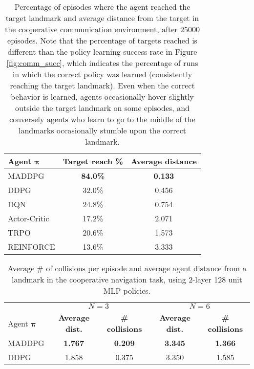 \documentclass{article}
\newcommand{\pol}[0]{\pmb{\pi}}
\begin{document}
\begin{table*}[ht!]
\small
\centering
\begin{tabular}{l c c}
\toprule
Agent $\pol$& \textbf{Target reach \% }&    \textbf{Average distance}   \\ \hline
MADDPG &  \textbf{84.0\%} & \textbf{0.133}  \\
DDPG &  32.0\% & 0.456 \\
DQN & 24.8\% & 0.754 \\
Actor-Critic & 17.2\% & 2.071 \\
TRPO & 20.6\% & 1.573 \\
REINFORCE &  13.6\%  & 3.333 \\
\bottomrule
\end{tabular}
\caption{\label{tab:simple_speaker_listener} Percentage of episodes where the agent reached the target landmark and average distance from the target in the cooperative communication environment, after 25000 episodes. Note that the percentage of targets reached is different than the policy learning success rate in Figure \ref{fig:comm_succ}, which indicates the percentage of runs in which the correct policy was learned (consistently reaching the target landmark). Even when the correct behavior is learned, agents occasionally hover slightly outside the target landmark on some episodes, and conversely agents who learn to go to the middle of the landmarks occasionally stumble upon the correct landmark.}
\end{table*}


\begin{table*}[ht!]
\small
\centering
\begin{tabular}{l c c c c}
\toprule
& \multicolumn{2}{c}{ $N = 3$} & \multicolumn{2}{c}{ $N = 6$} \\
Agent $\pol$& \textbf{Average dist.}&    \textbf{\# collisions} & \textbf{Average dist.}&    \textbf{\# collisions}   \\ \hline
MADDPG &  \textbf{1.767} & \textbf{0.209} & \textbf{3.345} & \textbf{1.366}  \\
DDPG &  1.858 & 0.375 & 3.350 & 1.585 \\
\bottomrule
\end{tabular}
\caption{\label{tab:simple_spread} Average \# of collisions per episode and average agent distance from a landmark in the cooperative navigation task, using 2-layer 128 unit MLP policies.}
\end{table*}
\end{document}
